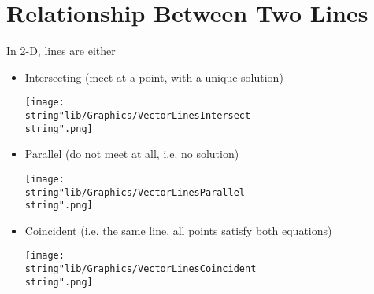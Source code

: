 \documentclass[11pt,a4paper]{book}
\begin{document}
\newpage

\section{Relationship Between Two Lines}

In 2-D, lines are either

\begin{itemize}

\item Intersecting (meet at a point, with a unique solution)
\begin{center}
\texttt{[image: \\string"lib/Graphics/VectorLinesIntersect\\string".png]}
\par\end{center}

\item Parallel (do not meet at all, i.e. no solution)
\begin{center}
\texttt{[image: \\string"lib/Graphics/VectorLinesParallel\\string".png]}
\par\end{center}

\item Coincident (i.e. the same line, all points satisfy both equations)
\begin{center}
\texttt{[image: \\string"lib/Graphics/VectorLinesCoincident\\string".png]}
\par\end{center}

\end{itemize}
\end{document}
